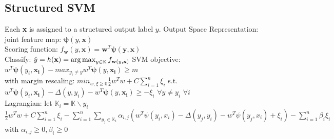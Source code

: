 \subsection*{Structured SVM}
Each \textbf{x} is assigned to a structured output label $y$.
Output Space Representation:\\
joint feature map: $\mathbf{\psi}(y,\mathbf{x})$\\
Scoring function: $f_{\mathbf{w}}(y,\mathbf{x})=\mathbf{w}^T\mathbf{\psi(y, \mathbf{x})}$\\
Classify: $\hat{y}=h(\mathbf{x})=\operatorname*{arg\,max}_{y\in\mathbb{K}}f_{\mathbf{w}(y, \mathbf{x})}$
SVM objective: \\ $w^T\mathbf{\psi}(y_i,\mathbf{x_i})-max_{y_i \neq y}w^T\mathbf{\psi}(y,\mathbf{x_i}) \geq m$ \\
with margin rescaling: $min_{w, \xi \geq 0} \frac{1}{2}w^Tw + C \sum_{i=1}^n \xi_i$ s.t. $w^T\mathbf{\psi}(y_i,\mathbf{x_i})-\Delta(y,y_i)
-w^T\mathbf{\psi}(y,\mathbf{x_i}) \geq - \xi_i$ $\forall y \neq y_i$ $\forall i$ \\
Lagrangian: let $\mathbb{K}_i = \mathbb{K} \backslash {y_i}$ \\ $\frac{1}{2}w^Tw + C \sum_{i=1}^n \xi_i - \sum_{i=1}^n \sum_{y_j \in \mathbb{K}_i} \alpha_{i,j} (w^T \psi(y_i, x_i)- \Delta (y_j, y_i) - w^T \psi(y_j,x_i)+ \xi_i) - \sum_{i=1}^n \beta_i \xi_i$ with $\alpha_{i,j} \geq 0, \beta_i \geq 0$ 
